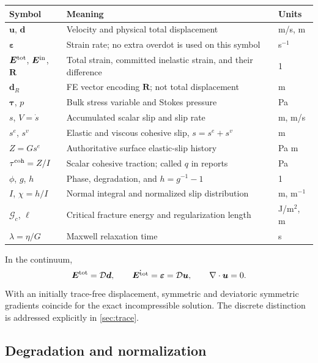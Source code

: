 \documentclass[11pt,a4paper]{article}
\newcommand{\strain}{\bm\varepsilon}
\newcommand{\tauv}{\bm\tau}
\newcommand{\R}{\bm R}
\newcommand{\Ein}{\bm E^{\rm in}}
\newcommand{\Etot}{\bm E^{\rm tot}}
\newcommand{\qcoh}{\tau^{\rm coh}}
\newcommand{\Gc}{\mathcal G_c}
\begin{document}
\begin{longtable}{L{.20\textwidth}L{.55\textwidth}L{.15\textwidth}}
\toprule Symbol & Meaning & Units\\\midrule\endhead
$\bm u$, $\bm d$ & Velocity and physical total displacement & m/s, m\\
$\strain$ & Strain rate; no extra overdot is used on this symbol & s$^{-1}$\\
$\Etot$, $\Ein$, $\R$ & Total strain, committed inelastic strain, and their difference & 1\\
$\bm d_R$ & FE vector encoding $\R$; not total displacement & m\\
$\tauv$, $p$ & Bulk stress variable and Stokes pressure & Pa\\
$s$, $V=\dot s$ & Accumulated scalar slip and slip rate & m, m/s\\
$s^e$, $s^v$ & Elastic and viscous cohesive slip, $s=s^e+s^v$ & m\\
$Z=Gs^e$ & Authoritative surface elastic-slip history & Pa m\\
$\qcoh=Z/I$ & Scalar cohesive traction; called $q$ in reports & Pa\\
$\phi$, $g$, $h$ & Phase, degradation, and $h=g^{-1}-1$ & 1\\
$I$, $\chi=h/I$ & Normal integral and normalized slip distribution & m, m$^{-1}$\\
$\Gc$, $\ell$ & Critical fracture energy and regularization length & J/m$^2$, m\\
$\lambda=\eta/G$ & Maxwell relaxation time & s\\
\bottomrule
\end{longtable}

In the continuum,
\begin{equation}
 \Etot=\mathcal D\bm d,\qquad
 \dot{\Etot}=\strain=\mathcal D\bm u,
 \qquad \nabla\cdot\bm u=0.
 \label{eq:strain-def}
\end{equation}
With an initially trace-free displacement, symmetric and deviatoric symmetric
gradients coincide for the exact incompressible solution. The discrete distinction
is addressed explicitly in \cref{sec:trace}.

\subsection{Degradation and normalization}
\end{document}
